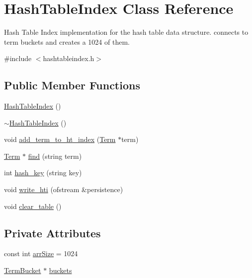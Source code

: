 \hypertarget{class_hash_table_index}{}\section{Hash\+Table\+Index Class Reference}
\label{class_hash_table_index}


Hash Table Index implementation for the hash table data structure. connects to term buckets and creates a 1024 of them.  




{\ttfamily \#include $<$hashtableindex.\+h$>$}

\subsection*{Public Member Functions}
\begin{DoxyCompactItemize}
\item 
\hyperlink{class_hash_table_index_a13c1c8deae84226c8bef382adf103b53}{Hash\+Table\+Index} ()
\item 
\hyperlink{class_hash_table_index_af4d2eeae8263c353f91140cb2583fb58}{$\sim$\+Hash\+Table\+Index} ()
\item 
void \hyperlink{class_hash_table_index_a383ac825c3dde6dd2791bb121da7138d}{add\+\_\+term\+\_\+to\+\_\+ht\+\_\+index} (\hyperlink{class_term}{Term} $\ast$term)
\item 
\hyperlink{class_term}{Term} $\ast$ \hyperlink{class_hash_table_index_a5934917eb943ab770d86ab7ff9142aab}{find} (string term)
\item 
int \hyperlink{class_hash_table_index_a93a1393996af092def6a7f2b9156f2c6}{hash\+\_\+key} (string key)
\item 
void \hyperlink{class_hash_table_index_a8ed7978b35943e4b89526bb5d7017f05}{write\+\_\+hti} (ofstream \&persistence)
\item 
void \hyperlink{class_hash_table_index_a253a51a2195d47b3350fdc27fd3d4077}{clear\+\_\+table} ()
\end{DoxyCompactItemize}
\subsection*{Private Attributes}
\begin{DoxyCompactItemize}
\item 
const int \hyperlink{class_hash_table_index_a1b302265c4ce75eb039d82bacd1f4bfd}{arr\+Size} = 1024
\item 
\hyperlink{class_term_bucket}{Term\+Bucket} $\ast$ \hyperlink{class_hash_table_index_a7737d10bb5720666b0bff86376a82a11}{buckets}
\end{DoxyCompactItemize}


